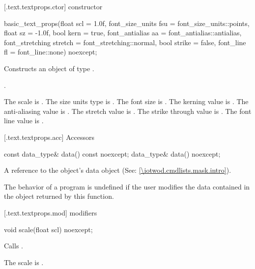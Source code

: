  [\iotwod.text.textprops.ctor] { constructor}

%
\begin{itemdecl}
basic_text_props(float scl = 1.0f,
  font_size_units fsu = font_size_units::points,
  float sz = -1.0f,
  bool kern = true,
  font_antialias aa = font_antialias::antialias,
  font_stretching stretch = font_stretching::normal,
  bool strike = false,
  font_line fl = font_line::none) noexcept;
\end{itemdecl}
\begin{itemdescr}
\pnum
\effects
Constructs an object of type .

\pnum
\postconditions {}.

\pnum
The scale is . The size units type is . The font size is . The kerning value is . The anti-aliasing value is . The stretch value is . The strike through value is . The font line value is .
\end{itemdescr}

 [\iotwod.text.textprops.acc] {Accessors}%

%
\begin{itemdecl}
const data_type& data() const noexcept;
data_type& data() noexcept;
\end{itemdecl}
\begin{itemdescr}
\pnum
\returns A reference to the  object's data object (See: \ref{\iotwod.cmdlists.mask.intro}).

\pnum
\remarks The behavior of a program is undefined if the user modifies the data contained in the  object returned by this function.
\end{itemdescr}

 [\iotwod.text.textprops.mod] { modifiers}

%
\begin{itemdecl}
void scale(float scl) noexcept;
\end{itemdecl}
\begin{itemdescr}
\pnum
\effects Calls .

\pnum
\remarks The scale is .
\end{itemdescr}

